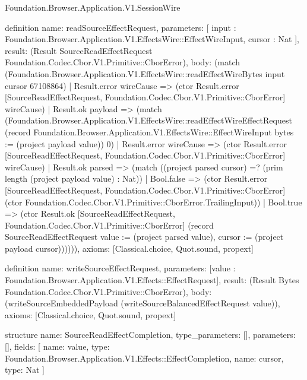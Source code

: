 \begin{lexlean}{Foundation.Browser.Application.V1.SessionWire}
\begin{semanticmodule}
definition{
  name: readSourceEffectRequest,
  parameters: [
    input : Foundation.Browser.Application.V1.EffectsWire::EffectWireInput,
    cursor : Nat
  ],
  result: (Result SourceReadEffectRequest Foundation.Codec.Cbor.V1.Primitive::CborError),
  body: (match (Foundation.Browser.Application.V1.EffectsWire::readEffectWireBytes input cursor 67108864)
    | Result.error wireCause => (ctor Result.error [SourceReadEffectRequest, Foundation.Codec.Cbor.V1.Primitive::CborError] wireCause)
    | Result.ok payload => (match (Foundation.Browser.Application.V1.EffectsWire::readEffectWireEffectRequest (record Foundation.Browser.Application.V1.EffectsWire::EffectWireInput {bytes := (project payload value)}) 0)
      | Result.error wireCause => (ctor Result.error [SourceReadEffectRequest, Foundation.Codec.Cbor.V1.Primitive::CborError] wireCause)
      | Result.ok parsed => (match ((project parsed cursor) =? (prim length (project payload value) : Nat))
        | Bool.false => (ctor Result.error [SourceReadEffectRequest, Foundation.Codec.Cbor.V1.Primitive::CborError] (ctor Foundation.Codec.Cbor.V1.Primitive::CborError.TrailingInput))
        | Bool.true => (ctor Result.ok [SourceReadEffectRequest, Foundation.Codec.Cbor.V1.Primitive::CborError] (record SourceReadEffectRequest {value := (project parsed value), cursor := (project payload cursor)}))))),
  axioms: [Classical.choice, Quot.sound, propext]
}

definition{
  name: writeSourceEffectRequest,
  parameters: [value : Foundation.Browser.Application.V1.Effects::EffectRequest],
  result: (Result Bytes Foundation.Codec.Cbor.V1.Primitive::CborError),
  body: (writeSourceEmbeddedPayload (writeSourceBalancedEffectRequest value)),
  axioms: [Classical.choice, Quot.sound, propext]
}

structure{
  name: SourceReadEffectCompletion,
  type_parameters: [],
  parameters: [],
  fields: [
    {name: value, type: Foundation.Browser.Application.V1.Effects::EffectCompletion},
    {name: cursor, type: Nat}
  ]
}


\end{semanticmodule}
\end{lexlean}
